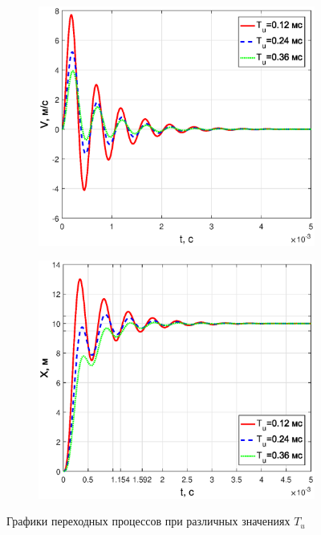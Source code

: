 \documentclass[12pt,a4paper]{article}
\begin{document}
\begin{figure}[H]
\begin{subfigure}[b]{0.48\textwidth}
	\end{subfigure}
	\begin{subfigure}[b]{0.48\textwidth}
		\includegraphics[width = \textwidth]{V2}
	\end{subfigure}
	\hfill
	\begin{subfigure}[b]{0.48\textwidth}
		\includegraphics[width = \textwidth]{X2}
	\end{subfigure}
	\caption{Графики переходных процессов при различных значениях $T_u$}
	\label{UFVX2}
\end{figure}
\end{document}
